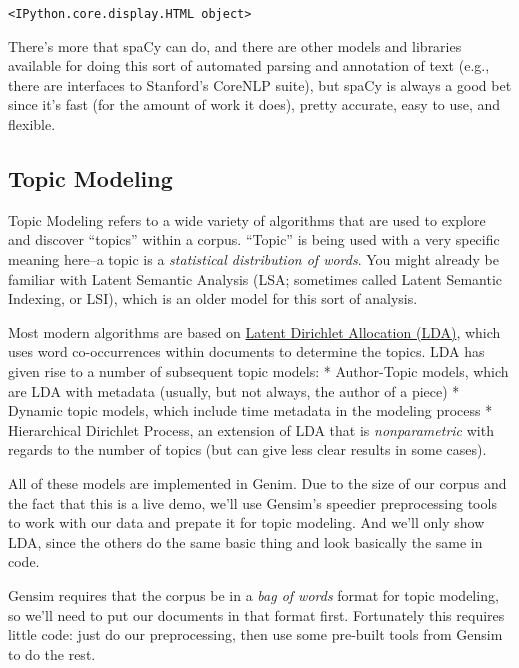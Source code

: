 \documentclass[11pt]{article}
\begin{document}
    
    \begin{verbatim}
<IPython.core.display.HTML object>
    \end{verbatim}

    
    There's more that spaCy can do, and there are other models and libraries
available for doing this sort of automated parsing and annotation of
text (e.g., there are interfaces to Stanford's CoreNLP suite), but spaCy
is always a good bet since it's fast (for the amount of work it does),
pretty accurate, easy to use, and flexible.

    \hypertarget{topic-modeling}{%
\subsection{Topic Modeling}\label{topic-modeling}}

Topic Modeling refers to a wide variety of algorithms that are used to
explore and discover ``topics'' within a corpus. ``Topic'' is being used
with a very specific meaning here--a topic is a \emph{statistical
distribution of words}. You might already be familiar with Latent
Semantic Analysis (LSA; sometimes called Latent Semantic Indexing, or
LSI), which is an older model for this sort of analysis.

Most modern algorithms are based on
\href{http://www.jmlr.org/papers/volume3/blei03a/blei03a.pdf}{Latent
Dirichlet Allocation (LDA)}, which uses word co-occurrences within
documents to determine the topics. LDA has given rise to a number of
subsequent topic models: * Author-Topic models, which are LDA with
metadata (usually, but not always, the author of a piece) * Dynamic
topic models, which include time metadata in the modeling process *
Hierarchical Dirichlet Process, an extension of LDA that is
\emph{nonparametric} with regards to the number of topics (but can give
less clear results in some cases).

All of these models are implemented in Genim. Due to the size of our
corpus and the fact that this is a live demo, we'll use Gensim's
speedier preprocessing tools to work with our data and prepate it for
topic modeling. And we'll only show LDA, since the others do the same
basic thing and look basically the same in code.

Gensim requires that the corpus be in a \emph{bag of words} format for
topic modeling, so we'll need to put our documents in that format first.
Fortunately this requires little code: just do our preprocessing, then
use some pre-built tools from Gensim to do the rest.
\end{document}
